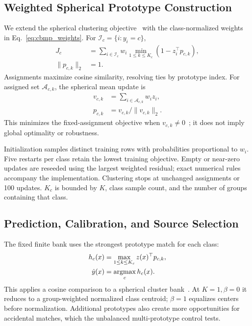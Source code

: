 \subsection{Weighted Spherical Prototype Construction}
We extend the spherical clustering objective~\cite{dhillon2001spherical} with the class-normalized weights in Eq.~\ref{eq:cbmp_weights}. For $\mathcal I_c=\{i:y_i=c\}$,
\begin{equation}
\begin{aligned}
    J_c &= \sum_{i\in\mathcal I_c} w_i
       \min_{1\leq k\leq K_c}(1-z_i^\top p_{c,k}),\\
    \|p_{c,k}\|_2&=1.
\end{aligned}
\label{eq:cbmp_clustering}
\end{equation}
Assignments maximize cosine similarity, resolving ties by prototype index. For assigned set $\mathcal A_{c,k}$, the spherical mean update is
\begin{equation}
\begin{aligned}
    v_{c,k}&=\sum_{i\in\mathcal A_{c,k}}w_i z_i,\\
    p_{c,k}&=v_{c,k}/\|v_{c,k}\|_2.
\end{aligned}
\label{eq:cbmp_update}
\end{equation}
This minimizes the fixed-assignment objective when $v_{c,k}\ne0$~\cite{dhillon2001spherical}; it does not imply global optimality or robustness.

Initialization samples distinct training rows with probabilities proportional to $w_i$. Five restarts per class retain the lowest training objective. Empty or near-zero updates are reseeded using the largest weighted residual; exact numerical rules accompany the implementation. Clustering stops at unchanged assignments or 100 updates. $K_c$ is bounded by $K$, class sample count, and the number of groups containing that class.

\subsection{Prediction, Calibration, and Source Selection}
The fixed finite bank uses the strongest prototype match for each class:
\begin{equation}
\begin{aligned}
    h_c(x)&=\max_{1\leq k\leq K_c}z(x)^\top p_{c,k},\\
    \hat y(x)&=\mathop{\rm argmax}_c h_c(x).
\end{aligned}
\label{eq:cbmp_prediction}
\end{equation}
This applies a cosine comparison to a spherical cluster bank~\cite{dhillon2001spherical,chen2019closer}. At $K=1,\beta=0$ it reduces to a group-weighted normalized class centroid; $\beta=1$ equalizes centers before normalization. Additional prototypes also create more opportunities for accidental matches, which the unbalanced multi-prototype control tests.

